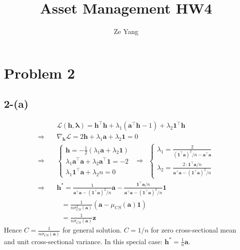 \documentclass[11pt]{article}
\title{Asset Management HW4}
\author{Ze Yang}
\begin{document}
    
    
    \maketitle
    
    \section*{Problem 2}
\subsection*{2-(a)}
\begin{equation}
 \begin{split}
   &\mathcal{L}(\bm{h}, \bm{\lambda}) = \bm{h}^{\top} \bm{h} + \lambda_1(\bm{a}^{\top} \bm{h} - 1) + \lambda_2 \bm{1}^{\top} \bm{h} \\
   \Rightarrow \quad &
   \nabla_{\bm{h}} \mathcal{L} = 2 \bm{h} + \lambda_1 \bm{a} + \lambda_2 \bm{1} = 0 \\
   \Rightarrow \quad &
   \begin{cases}
   \bm{h} = -\frac{1}{2} (\lambda_1 \bm{a} + \lambda_2 \bm{1}) \\
   \lambda_1 \bm{a}^{\top} \bm{a} +  \lambda_2 \bm{a}^{\top} \bm{1} = -2\\
   \lambda_1 \bm{1}^{\top} \bm{a} + \lambda_2 n = 0
   \end{cases} ~~\Rightarrow~~\begin{cases}
   \lambda_1 = \frac{2}{(\bm{1}^{\top} \bm{a})^2/n - \bm{a}^{\top} \bm{a}}\\
   \lambda_2 = \frac{2\cdot\bm{1}^{\top} \bm{a}/n}{\bm{a}^{\top} \bm{a} - (\bm{1}^{\top} \bm{a})^2/n}
   \end{cases}\\
   \Rightarrow\quad& \bm{h}^* = \frac{1}{\bm{a}^{\top} \bm{a} - (\bm{1}^{\top} \bm{a})^2/n} \bm{a} - \frac{\bm{1}^{\top} \bm{a}/n}{\bm{a}^{\top} \bm{a} - (\bm{1}^{\top} \bm{a})^2/n} \bm{1} \\
   &~~~=  \frac{1}{n \sigma_{CS}^2(\bm{a})} \left(\bm{a} - \mu_{CS}(\bm{a}) \bm{1}\right) \\
   &~~~= \frac{1}{n \sigma_{CS}(\bm{a})} \bm{z}
 \end{split}
 \end{equation} 
 Hence $C=\frac{1}{n \sigma_{CS}(\bm{a})}$ for general solution. $C=1/n$ for zero cross-sectional mean and unit cross-sectional variance. In this special case: $\bm{h}^* = \frac{1}{n} \bm{a}$.
\end{document}
